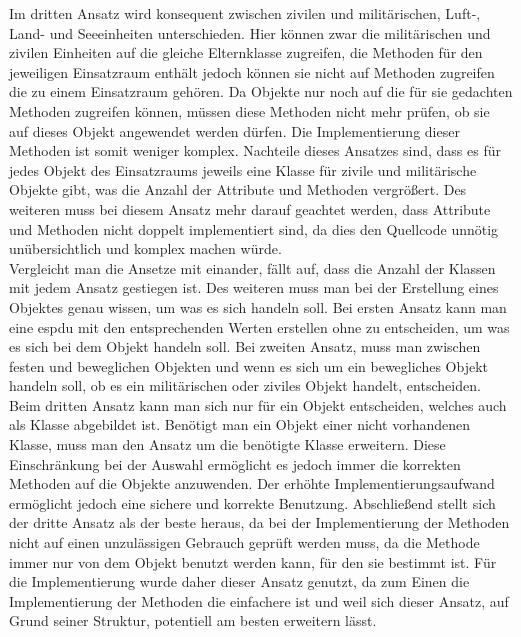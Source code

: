 Im dritten Ansatz wird konsequent zwischen zivilen und militärischen, Luft-, Land- und Seeeinheiten unterschieden. Hier können zwar die militärischen und zivilen Einheiten auf die gleiche Elternklasse zugreifen, die Methoden für den jeweiligen Einsatzraum enthält jedoch können sie nicht auf Methoden zugreifen die zu einem Einsatzraum gehören. Da Objekte nur noch auf die für sie gedachten Methoden zugreifen können, müssen diese Methoden nicht mehr prüfen, ob sie auf dieses Objekt angewendet werden dürfen. Die Implementierung dieser Methoden ist somit weniger komplex. Nachteile dieses Ansatzes sind, dass es für jedes Objekt des Einsatzraums jeweils eine Klasse für zivile und militärische Objekte gibt, was die Anzahl der Attribute und Methoden vergrößert. Des weiteren  muss bei diesem Ansatz mehr darauf geachtet werden, dass Attribute und Methoden  nicht doppelt implementiert sind, da dies den Quellcode unnötig unübersichtlich und komplex machen würde. 
\\
Vergleicht man die Ansetze mit einander, fällt auf, dass die Anzahl der Klassen mit jedem Ansatz gestiegen ist. Des weiteren muss man bei der Erstellung eines Objektes genau wissen, um was es sich handeln soll.
Bei ersten Ansatz kann man eine \ac{espdu} mit den entsprechenden Werten erstellen ohne zu entscheiden, um was es sich bei dem Objekt handeln soll. Bei zweiten Ansatz, muss man zwischen festen und beweglichen Objekten und wenn es sich um ein bewegliches Objekt handeln soll, ob es ein militärischen oder ziviles Objekt handelt, entscheiden. Beim dritten Ansatz kann man sich nur für ein Objekt entscheiden, welches auch als Klasse abgebildet ist. Benötigt man ein Objekt einer nicht vorhandenen Klasse, muss man den Ansatz um die benötigte Klasse erweitern. Diese Einschränkung bei der Auswahl ermöglicht es jedoch immer die korrekten Methoden auf die Objekte anzuwenden. Der erhöhte Implementierungsaufwand ermöglicht jedoch eine sichere und korrekte Benutzung. 
Abschließend stellt sich der dritte Ansatz als der beste heraus, da bei der Implementierung der Methoden nicht auf einen unzulässigen Gebrauch geprüft werden muss, da die Methode immer nur von dem Objekt benutzt werden kann, für den sie bestimmt ist. Für die Implementierung wurde daher dieser Ansatz genutzt, da zum Einen die Implementierung der Methoden die einfachere ist und weil sich dieser Ansatz, auf Grund seiner Struktur,  potentiell am  besten erweitern lässt.  


